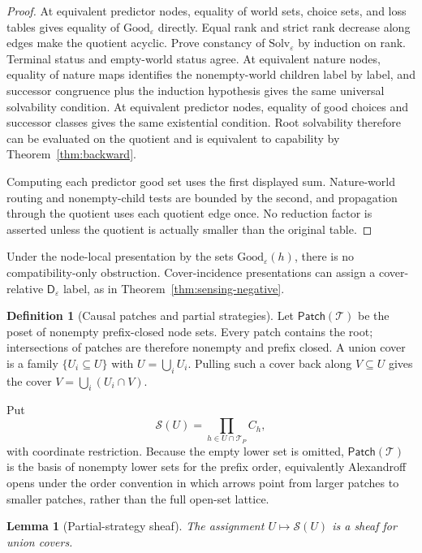 \documentclass[11pt]{article}
\theoremstyle{plain}
\newtheorem{lemma}[theorem]{Lemma}
\theoremstyle{definition}
\newtheorem{definition}[theorem]{Definition}
\theoremstyle{remark}
\newcommand{\eps}{\varepsilon}
\begin{document}
\begin{proof}
At equivalent predictor nodes, equality of world sets, choice sets, and loss
tables gives equality of $\mathrm{Good}_\eps$ directly. Equal rank and strict
rank decrease along edges make the quotient acyclic. Prove constancy of
$\mathrm{Solv}_\eps$ by induction on rank. Terminal status and empty-world
status agree. At equivalent nature nodes, equality of nature maps identifies
the nonempty-world children label by label, and successor congruence plus the
induction hypothesis gives the same universal solvability condition. At
equivalent predictor nodes, equality of good choices and successor classes gives
the same existential condition. Root solvability therefore can be evaluated on
the quotient and is equivalent to capability by
Theorem~\ref{thm:backward}.

Computing each predictor good set uses the first displayed sum. Nature-world
routing and nonempty-child tests are bounded by the second, and propagation
through the quotient uses each quotient edge once. No reduction factor is
asserted unless the quotient is actually smaller than the original table.
\end{proof}


Under the node-local presentation by the sets $\mathrm{Good}_\eps(h)$, there is
no compatibility-only obstruction. Cover-incidence presentations can assign a
cover-relative $\mathsf D_\eps$ label, as in
Theorem~\ref{thm:sensing-negative}.

\begin{definition}[Causal patches and partial strategies]\label{def:patch}
Let $\mathsf{Patch}(\mathcal T)$ be the poset of nonempty prefix-closed node
sets. Every patch contains the root; intersections of patches are therefore
nonempty and prefix closed. A union cover is a family $\{U_i\subseteq U\}$ with
$U=\bigcup_iU_i$. Pulling such a cover back along $V\subseteq U$ gives the cover
$V=\bigcup_i(U_i\cap V)$.

Put
\[
\mathscr S(U)=\prod_{h\in U\cap \mathcal T_P}C_h,
\]
with coordinate restriction. Because the empty lower set is omitted,
$\mathsf{Patch}(\mathcal T)$ is the basis of nonempty lower sets for the prefix
order, equivalently Alexandroff opens under the order convention in which arrows
point from larger patches to smaller patches, rather than the full open-set
lattice.
\end{definition}

\begin{lemma}[Partial-strategy sheaf]\label{lem:strategy-sheaf}
The assignment $U\mapsto\mathscr S(U)$ is a sheaf for union covers.
\end{lemma}
\end{document}
